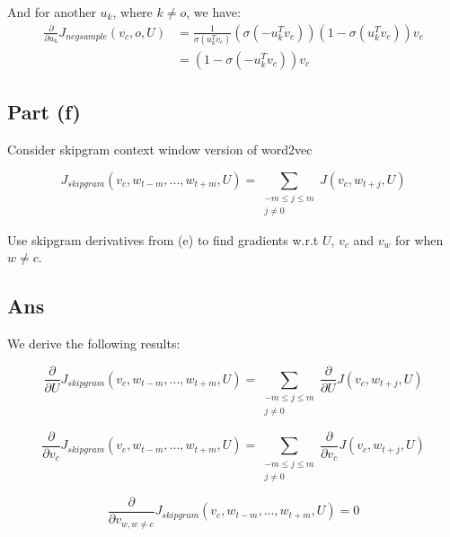 \documentclass{article}
\begin{document}
And for another $u_k$, where $k \neq o$, we have:
\begin{align*}
\frac{\partial}{\partial u_k} J_{negsample}(v_c, o, U) 
&= \frac{1}{\sigma (u_k^T v_c)}(\sigma (-u_k^T v_c))(1 - \sigma (u_k^T v_c)) v_c \\
&= (1 - \sigma (-u_k^T v_c)) v_c
\end{align*}

\subsection*{Part (f)}
Consider skipgram context window version of word2vec

\begin{equation} J_{skipgram} (v_c, w_{t-m}, ..., w_{t+m}, U) =  \sum_{\substack{ -m \leq j \leq m \\ j \neq 0}} J(v_c, w_{t+j}, U)
\end{equation}

Use skipgram derivatives from (e) to find gradients w.r.t $U$, $v_c$ and $v_w$ for when $w \neq c$.

\subsection*{Ans}
We derive the following results:

\begin{equation}
\frac{\partial}{\partial U} J_{skipgram} (v_c, w_{t-m}, ..., w_{t+m}, U) = \sum_{\substack{ -m \leq j \leq m \\ j \neq 0}} \frac{\partial}{\partial U} J(v_c, w_{t+j}, U)
\end{equation}

\begin{equation}
\frac{\partial}{\partial v_c} J_{skipgram} (v_c, w_{t-m}, ..., w_{t+m}, U)  = \sum_{\substack{ -m \leq j \leq m \\ j \neq 0}} \frac{\partial}{\partial v_c} J(v_c, w_{t+j}, U)
\end{equation}

\begin{equation}
\frac{\partial}{\partial v_{w, w \neq c}} J_{skipgram} (v_c, w_{t-m}, ..., w_{t+m}, U)  = 0
\end{equation}
\end{document}
